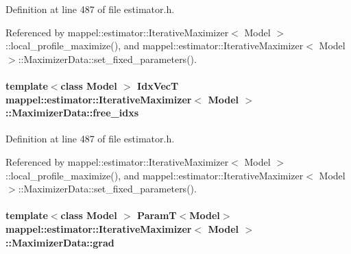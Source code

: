 Definition at line 487 of file estimator.\+h.



Referenced by mappel\+::estimator\+::\+Iterative\+Maximizer$<$ Model $>$\+::local\+\_\+profile\+\_\+maximize(), and mappel\+::estimator\+::\+Iterative\+Maximizer$<$ Model $>$\+::\+Maximizer\+Data\+::set\+\_\+fixed\+\_\+parameters().

\paragraph[{\texorpdfstring{free\+\_\+idxs}{free_idxs}}]{\setlength{\rightskip}{0pt plus 5cm}template$<$class Model $>$ {\bf Idx\+VecT} {\bf mappel\+::estimator\+::\+Iterative\+Maximizer}$<$ Model $>$\+::Maximizer\+Data\+::free\+\_\+idxs}\hypertarget{classmappel_1_1estimator_1_1IterativeMaximizer_1_1MaximizerData_a96fb9ed6b5c603ab2380b9dd24723bca}{}\label{classmappel_1_1estimator_1_1IterativeMaximizer_1_1MaximizerData_a96fb9ed6b5c603ab2380b9dd24723bca}


Definition at line 487 of file estimator.\+h.



Referenced by mappel\+::estimator\+::\+Iterative\+Maximizer$<$ Model $>$\+::local\+\_\+profile\+\_\+maximize(), and mappel\+::estimator\+::\+Iterative\+Maximizer$<$ Model $>$\+::\+Maximizer\+Data\+::set\+\_\+fixed\+\_\+parameters().

\paragraph[{\texorpdfstring{grad}{grad}}]{\setlength{\rightskip}{0pt plus 5cm}template$<$class Model $>$ {\bf ParamT}$<$Model$>$ {\bf mappel\+::estimator\+::\+Iterative\+Maximizer}$<$ Model $>$\+::Maximizer\+Data\+::grad}\hypertarget{classmappel_1_1estimator_1_1IterativeMaximizer_1_1MaximizerData_a7a71e71e379159ee30914e0539196c71}{}\label{classmappel_1_1estimator_1_1IterativeMaximizer_1_1MaximizerData_a7a71e71e379159ee30914e0539196c71}


